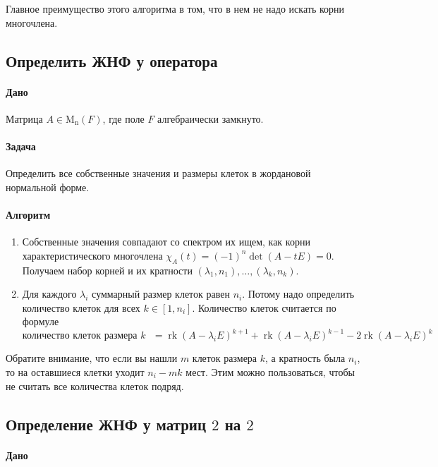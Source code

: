 \documentclass{article}
\newcommand{\Matrix}[2]{\operatorname{\mathrm{M}_{#2}}(#1)}
\newcommand{\rk}{\operatorname{rk}}
\begin{document}
Главное преимущество этого алгоритма в том, что в нем не надо искать корни многочлена.

\subsection{Определить ЖНФ у оператора}

\paragraph{Дано}

Матрица $A\in \Matrix{F}{n}$, где поле $F$ алгебраически замкнуто.

\paragraph{Задача}

Определить все собственные значения и размеры клеток в жордановой нормальной форме.

\paragraph{Алгоритм}

\begin{enumerate}
\item Собственные значения совпадают со спектром их ищем, как корни характеристического многочлена $\chi_A(t) = (-1)^n\det(A - t E) = 0$.
Получаем набор корней и их кратности $(\lambda_1, n_1),\ldots,(\lambda_k,n_k)$.

\item Для каждого $\lambda_i$ суммарный размер клеток равен $n_i$.
Потому надо определить количество клеток для всех $k\in [1, n_i]$.
Количество клеток считается по формуле
\[
\text{количество клеток размера $k$ } = \rk (A - \lambda_i E)^{k+1} + \rk(A - \lambda_i E)^{k-1} - 2 \rk(A - \lambda_i E)^k
\]
\end{enumerate}

Обратите внимание, что если вы нашли $m$ клеток размера $k$, а кратность была $n_i$, то на оставшиеся клетки уходит $n_i - mk$ мест.
Этим можно пользоваться, чтобы не считать все количества клеток подряд.

\subsection{Определение ЖНФ у матриц $2$ на $2$}

\paragraph{Дано}
\end{document}
